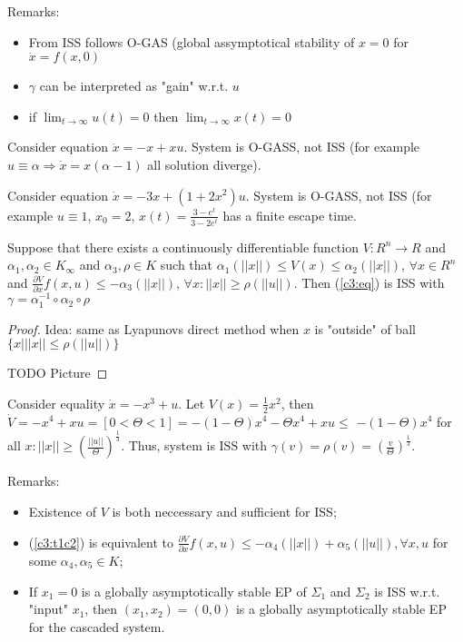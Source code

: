 Remarks:

\begin{itemize}
 \item From ISS follows O-GAS (global assymptotical stability of $x=0$ for
   $\dot x=f(x,0)$
 \item $\gamma$ can be interpreted as "gain" w.r.t. $u$
 \item if $\lim_{t\to\infty} u(t)=0$ then $\lim_{t \to\infty}x(t)=0$
\end{itemize}

\begin{Example}
 Consider equation $\dot x = -x+xu$. System is O-GASS, not ISS (for example
 $u\equiv\alpha \Rightarrow \dot x = x (\alpha-1)$ all solution diverge).
\end{Example}

\begin{Example}
 Consider equation $\dot x =-3x+(1+2x^2)u$. System is O-GASS, not ISS (for example 
 $u\equiv1$, $x_0=2$, $x(t)=\frac{3-e^{t}}{3-2e^{t}}$ has a finite escape time.
\end{Example}

\begin{Theorem}
 Suppose that there exists a continuously differentiable function 
 $V:R^n\to R$ and $\alpha_1,\alpha_2\in K_\infty$ and $\alpha_3, \rho \in K$
 such that $\alpha_1(||x||)\le V(x)\le\alpha_2(||x||)$, $\forall x\in R^n$ and
 $\frac{\partial V}{\partial x}f(x,u)\le-\alpha_3(||x||)$,
 $\forall x: ||x||\ge\rho(||u||)$. Then (\ref{c3:eq}) is ISS with 
 $\gamma = \alpha_1^{-1} \circ \alpha_2\circ\rho$

 \begin{proof}
 Idea: same as Lyapunovs direct method when $x$ is "outside" of ball
 $\{x | ||x||\le\rho(||u||)\}$

 TODO Picture
 \end{proof}
\end{Theorem}


\begin{Example}
 Consider equality $\dot x = -x^3+u$. Let $V(x)=\frac{1}{2}x^2$, then
 $\dot V = -x^4+xu=[0<\Theta<1]=-(1-\Theta)x^4-\Theta x^4+xu\le$
 $-(1-\Theta)x^4$ for all $x: ||x||\ge\left(\frac{||u||}{\Theta}\right)^\frac{1}{3}$.
 Thus, system is ISS with 
 $\gamma(v)=\rho(v)=\left(\frac{v}{\Theta}\right)^\frac{1}{3}$.
\end{Example}


Remarks:
\begin{itemize}
 \item Existence of $V$ is both neccessary and sufficient for ISS;
 \item (\ref{c3:t1c2}) is equivalent to $\frac{\partial V}{\partial x}f(x,u) \le -\alpha_4(||x||)+\alpha_5(||u||), \forall x,u$ for some $\alpha_4,\alpha_5\in K$;
 \item %
  If $x_1=0$ is a globally asymptotically stable EP of $\Sigma_1$ and $\Sigma_2$ is ISS w.r.t. "input" $x_1$, then $(x_1,x_2)=(0,0)$ is a globally asymptotically stable EP for the cascaded system.
\end{itemize}

